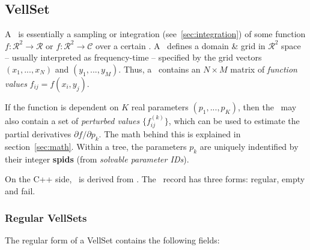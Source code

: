 \subsection{VellSet}

  A \VellSet\ is essentially a sampling or integration
  (see~\ref{sec:integration}) of some function
  $f:\mathcal{R}^2\rightarrow\mathcal{R}$ or 
  $f:\mathcal{R}^2\rightarrow\mathcal{C}$ over a certain \Cells. A \Cells\ 
  defines a domain \& grid in $\mathcal{R}^2$ space -- usually interpreted as
  frequency-time -- specified by the grid vectors $(x_1,...,x_N)$ and
  $(y_1,...,y_M)$. Thus, a \VellSet\ contains an $N\times M$ matrix of {\em
  function values} $f_{ij}=f(x_i,y_j)$.

  If the function is dependent on $K$ real parameters $(p_1,...,p_K)$, then the
  \VellSet\ may also contain a set of {\em perturbed values}
  $\{f^{(k)}_{ij}\}$, which can be used to estimate the partial derivatives
  $\partial f/\partial p_k$. The math behind this is explained in
  section~\ref{sec:math}. Within a tree, the parameters $p_k$ are uniquely
  indentified by their integer {\bf spids} (from {\em solvable parameter IDs}\/).

  On the C++ side, \VellSet\ is derived from . The \VellSet\
  record has three forms: regular, empty and fail.
  
\subsubsection{Regular VellSets}
  
  The regular form of a VellSet contains the following fields:

